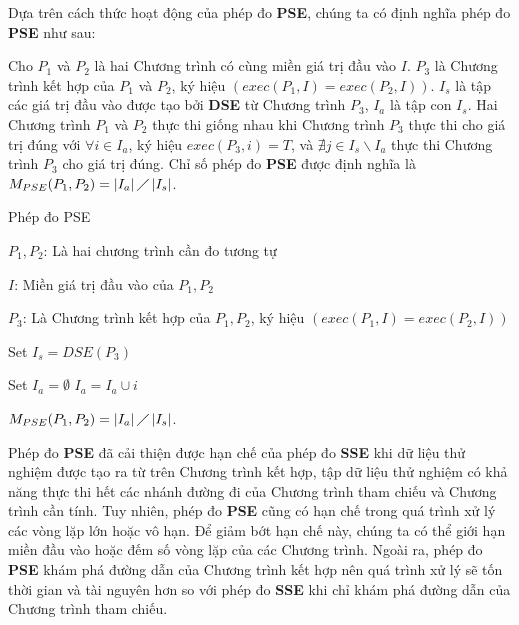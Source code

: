 

Dựa trên cách thức hoạt động của phép đo \textbf{PSE}, chúng ta có định nghĩa phép đo \textbf{PSE} như sau:
\begin{definition}
	Cho $P_{1}$ và $P_{2}$ là hai Chương trình có cùng miền giá trị đầu vào $I$. $P_{3}$ là Chương trình
	kết hợp của $P_{1}$ và $P_{2}$, ký hiệu $(exec(P_{1}, I) =  exec(P_{2}, I))$.  $I_{s}$ là tập các giá trị đầu vào được tạo bởi \textbf{DSE} từ Chương trình $P_{3}$, $I_{a}$ là tập con $I_{s}$. Hai Chương trình $P_{1}$ và $P_{2}$ thực thi giống nhau khi Chương trình $P_{3}$ thực thi cho giá trị đúng với $\forall i \in I_{a}$, ký hiệu $exec(P_{3}, i) = T$, và $\nexists j \in I_{s} \backslash I_{a}$ thực thi Chương trình $P_{3}$ cho giá trị đúng. Chỉ số phép đo \textbf{PSE} được định nghĩa là $M_{PSE}(P_{1}, P_{2}) = \left|I_{a}\right| \diagup \left|I_{s}\right| $.
\end{definition}

\begin{algorithm}[H]
	\caption{Phép đo PSE}
	\begin{algorithmic}	
		\item $P_{1}, P_{2}$: Là hai chương trình cần đo tương tự
		\item $I$: Miền giá trị đầu vào của $P_{1}, P_{2}$
		\item $P_{3}$: Là Chương trình kết hợp của $P_{1}, P_{2}$, ký hiệu  $(exec(P_{1}, I) = exec(P_{2}, I))$
		\item Set $I_{s} = DSE(P_{3})$ 
		\item Set $I_{a} = \emptyset$ 
		  		
			\State $I_{a} = I_{a} \cup i$		
			\EndIf
		\EndWhile
		\item $M_{PSE}(P_{1}, P_{2}) = \left|I_{a}\right| \diagup \left|I_{s}\right| $. 
	\end{algorithmic}
\end{algorithm}


Phép đo \textbf{PSE} đã cải thiện được hạn chế của phép đo \textbf{SSE} khi dữ liệu thử nghiệm được  tạo ra từ trên Chương trình kết hợp, tập dữ liệu thử nghiệm có khả năng thực thi hết các nhánh đường đi của Chương trình tham chiếu và Chương trình cần tính. Tuy nhiên, phép đo \textbf{PSE} cũng có hạn chế trong quá trình xử lý các vòng lặp lớn hoặc vô hạn. Để giảm bớt hạn chế này, chúng ta có thể giới hạn miền đầu vào hoặc đếm số vòng lặp của các Chương trình. Ngoài ra, phép đo \textbf{PSE} khám phá đường dẫn của Chương trình kết hợp nên quá trình xử lý sẽ tốn thời gian và tài nguyên hơn so với phép đo \textbf{SSE} khi chỉ khám phá đường dẫn của Chương trình tham chiếu.

